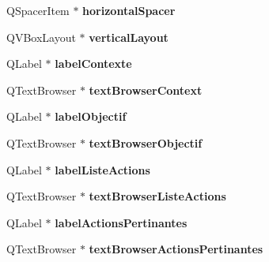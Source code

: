 \begin{DoxyCompactItemize}
\item 
\hypertarget{class_ui___relevant_actions_a042c576201a82a69155436a0e83dcb4f}{Q\-Spacer\-Item $\ast$ {\bfseries horizontal\-Spacer}}\label{class_ui___relevant_actions_a042c576201a82a69155436a0e83dcb4f}

\item 
\hypertarget{class_ui___relevant_actions_ab8c9e9294f56c05e413ca4981d767d5e}{Q\-V\-Box\-Layout $\ast$ {\bfseries vertical\-Layout}}\label{class_ui___relevant_actions_ab8c9e9294f56c05e413ca4981d767d5e}

\item 
\hypertarget{class_ui___relevant_actions_abe9eeda1230b3b721c0bcb3827a426ee}{Q\-Label $\ast$ {\bfseries label\-Contexte}}\label{class_ui___relevant_actions_abe9eeda1230b3b721c0bcb3827a426ee}

\item 
\hypertarget{class_ui___relevant_actions_a12d9783e8c390a5dd7d14b3b090a08bf}{Q\-Text\-Browser $\ast$ {\bfseries text\-Browser\-Context}}\label{class_ui___relevant_actions_a12d9783e8c390a5dd7d14b3b090a08bf}

\item 
\hypertarget{class_ui___relevant_actions_afb3e1df600f869a7b0182faeba88a468}{Q\-Label $\ast$ {\bfseries label\-Objectif}}\label{class_ui___relevant_actions_afb3e1df600f869a7b0182faeba88a468}

\item 
\hypertarget{class_ui___relevant_actions_a5f991c453e37d2defd616b891bede40e}{Q\-Text\-Browser $\ast$ {\bfseries text\-Browser\-Objectif}}\label{class_ui___relevant_actions_a5f991c453e37d2defd616b891bede40e}

\item 
\hypertarget{class_ui___relevant_actions_ad0a15a998290de4ab0f977f482b3fe4c}{Q\-Label $\ast$ {\bfseries label\-Liste\-Actions}}\label{class_ui___relevant_actions_ad0a15a998290de4ab0f977f482b3fe4c}

\item 
\hypertarget{class_ui___relevant_actions_ad69dfb45c232baab55418befd013f99e}{Q\-Text\-Browser $\ast$ {\bfseries text\-Browser\-Liste\-Actions}}\label{class_ui___relevant_actions_ad69dfb45c232baab55418befd013f99e}

\item 
\hypertarget{class_ui___relevant_actions_ad24e8d7227c01d302869aa4223447f24}{Q\-Label $\ast$ {\bfseries label\-Actions\-Pertinantes}}\label{class_ui___relevant_actions_ad24e8d7227c01d302869aa4223447f24}

\item 
\hypertarget{class_ui___relevant_actions_a0215c435ba985cb1879a9e55546c201f}{Q\-Text\-Browser $\ast$ {\bfseries text\-Browser\-Actions\-Pertinantes}}\label{class_ui___relevant_actions_a0215c435ba985cb1879a9e55546c201f}


\end{DoxyCompactItemize}
